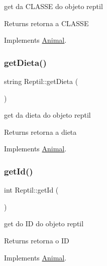 get da C\+L\+A\+S\+SE do objeto reptil 

\begin{DoxyReturn}{Returns}
retorna a C\+L\+A\+S\+SE 
\end{DoxyReturn}


Implements \mbox{\hyperlink{class_animal}{Animal}}.

\mbox{\label{class_reptil_a920c5c5923067c336b6e608050739e83}} 
\subsubsection{\texorpdfstring{getDieta()}{getDieta()}}
{\footnotesize\ttfamily string Reptil\+::get\+Dieta (\begin{DoxyParamCaption}{ }\end{DoxyParamCaption})\hspace{0.3cm}{\ttfamily [virtual]}}



get da dieta do objeto reptil 

\begin{DoxyReturn}{Returns}
retorna a dieta 
\end{DoxyReturn}


Implements \mbox{\hyperlink{class_animal}{Animal}}.

\mbox{\label{class_reptil_a773549483c3a5588f96937606401d9af}} 
\subsubsection{\texorpdfstring{getId()}{getId()}}
{\footnotesize\ttfamily int Reptil\+::get\+Id (\begin{DoxyParamCaption}{ }\end{DoxyParamCaption})\hspace{0.3cm}{\ttfamily [virtual]}}



get do ID do objeto reptil 

\begin{DoxyReturn}{Returns}
retorna o ID 
\end{DoxyReturn}


Implements \mbox{\hyperlink{class_animal}{Animal}}.

\mbox{\label{class_reptil_aaff178bb8919c1cae9f205bbba3c46cc}} 
